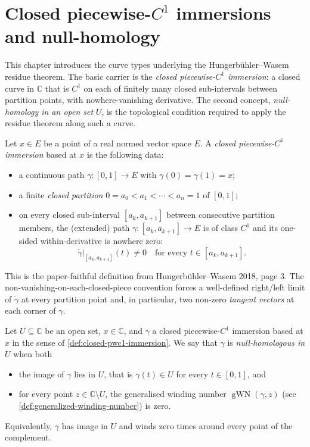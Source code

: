 \section{Closed piecewise-\texorpdfstring{$C^{1}$}{C¹} immersions and null-homology}\label{sec:curves}

This chapter introduces the curve types underlying the
Hungerbühler--Wasem residue theorem. The basic carrier is the
\emph{closed piecewise-$C^{1}$ immersion}: a closed curve in
$\mathbb{C}$ that is $C^{1}$ on each of finitely many closed
sub-intervals between partition points, with nowhere-vanishing
derivative. The second concept, \emph{null-homology in an open set}
$U$, is the topological condition required to apply the residue
theorem along such a curve.

\begin{definition}
  \label{def:closed-pwc1-immersion}
  \leanok
  Let $x \in E$ be a point of a real normed vector space $E$.
  A \emph{closed piecewise-$C^{1}$ immersion} based at $x$ is the
  following data:
  \begin{itemize}
    \item a continuous path $\gamma : [0,1] \to E$ with
      $\gamma(0) = \gamma(1) = x$;
    \item a finite \emph{closed partition}
      $0 = a_0 < a_1 < \cdots < a_n = 1$ of $[0,1]$;
    \item on every closed sub-interval $[a_k, a_{k+1}]$ between
      consecutive partition members, the (extended) path
      $\gamma : [a_k, a_{k+1}] \to E$ is of class $C^{1}$ and its
      one-sided within-derivative is nowhere zero:
      \[
        \dot{\gamma}|_{[a_k, a_{k+1}]}(t) \ne 0
        \quad \text{for every } t \in [a_k, a_{k+1}].
      \]
  \end{itemize}
  This is the paper-faithful definition from Hungerbühler--Wasem 2018,
  page 3. The non-vanishing-on-each-closed-piece convention forces a
  well-defined right/left limit of $\dot{\gamma}$ at every partition
  point and, in particular, two non-zero \emph{tangent vectors} at each
  corner of $\gamma$.
\end{definition}

\begin{definition}
  \label{def:null-homologous}
  \leanok
  Let $U \subseteq \mathbb{C}$ be an open set, $x \in \mathbb{C}$, and
  $\gamma$ a closed piecewise-$C^{1}$ immersion based at $x$ in the
  sense of \cref{def:closed-pwc1-immersion}. We say that $\gamma$ is
  \emph{null-homologous in $U$} when both
  \begin{itemize}
    \item the image of $\gamma$ lies in $U$, that is
      $\gamma(t) \in U$ for every $t \in [0,1]$, and
    \item for every point $z \in \mathbb{C} \setminus U$, the
      generalised winding number
      $\operatorname{gWN}(\gamma, z)$ (see
      \cref{def:generalized-winding-number}) is zero.
  \end{itemize}
  Equivalently, $\gamma$ has image in $U$ and winds zero times around
  every point of the complement.
\end{definition}
